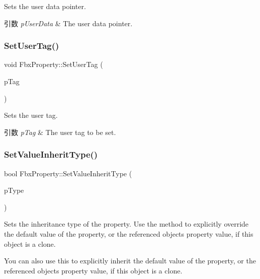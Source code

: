 Sets the user data pointer. 
\begin{DoxyParams}{引数}
{\em p\+User\+Data} & The user data pointer. \\
\hline
\end{DoxyParams}
\mbox{\label{class_fbx_property_affbc6e79fd35b52606d84d4e6839725c}} 
\subsubsection{\texorpdfstring{Set\+User\+Tag()}{SetUserTag()}}
{\footnotesize\ttfamily void Fbx\+Property\+::\+Set\+User\+Tag (\begin{DoxyParamCaption}\item[{int}]{p\+Tag }\end{DoxyParamCaption})}

Sets the user tag. 
\begin{DoxyParams}{引数}
{\em p\+Tag} & The user tag to be set. \\
\hline
\end{DoxyParams}
\mbox{\label{class_fbx_property_ad83cb36df88b5c088d955effd462d4be}} 
\subsubsection{\texorpdfstring{Set\+Value\+Inherit\+Type()}{SetValueInheritType()}}
{\footnotesize\ttfamily bool Fbx\+Property\+::\+Set\+Value\+Inherit\+Type (\begin{DoxyParamCaption}\item[{\hyperlink{class_fbx_property_flags_ae3b667a4fcac4b827fa186a698fec2f8}{Fbx\+Property\+Flags\+::\+E\+Inherit\+Type}}]{p\+Type }\end{DoxyParamCaption})}

Sets the inheritance type of the property. Use the method to explicitly override the default value of the property, or the referenced object\textquotesingle{}s property value, if this object is a clone.

You can also use this to explicitly inherit the default value of the property, or the referenced object\textquotesingle{}s property value, if this object is a clone.


